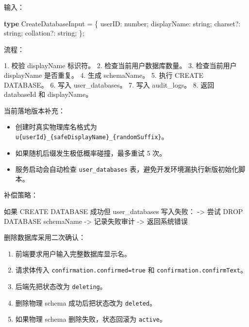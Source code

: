 \documentclass[
  a4paper,
  UTF8]{ctexart}
\newenvironment{Shaded}{}{}
\newcommand{\DataTypeTok}[1]{\textcolor[rgb]{0.56,0.13,0.00}{#1}}
\newcommand{\KeywordTok}[1]{\textcolor[rgb]{0.00,0.44,0.13}{\textbf{#1}}}
\newcommand{\NormalTok}[1]{#1}
\newcommand{\OperatorTok}[1]{\textcolor[rgb]{0.40,0.40,0.40}{#1}}
\providecommand{\tightlist}{%
  \setlength{\itemsep}{0pt}\setlength{\parskip}{0pt}}
\begin{document}
输入：

\begin{Shaded}
\begin{Highlighting}[]
\KeywordTok{type}\NormalTok{ CreateDatabaseInput }\OperatorTok{=}\NormalTok{ \{}
\NormalTok{  userID}\OperatorTok{:} \DataTypeTok{number}\OperatorTok{;}
\NormalTok{  displayName}\OperatorTok{:} \DataTypeTok{string}\OperatorTok{;}
\NormalTok{  charset}\OperatorTok{?:} \DataTypeTok{string}\OperatorTok{;}
\NormalTok{  collation}\OperatorTok{?:} \DataTypeTok{string}\OperatorTok{;}
\NormalTok{\}}\OperatorTok{;}
\end{Highlighting}
\end{Shaded}

流程：

\begin{Shaded}
\begin{Highlighting}[]
\NormalTok{1. 校验 displayName 标识符。}
\NormalTok{2. 检查当前用户数据库数量。}
\NormalTok{3. 检查当前用户 displayName 是否重复。}
\NormalTok{4. 生成 schemaName。}
\NormalTok{5. 执行 CREATE DATABASE。}
\NormalTok{6. 写入 user\_databases。}
\NormalTok{7. 写入 audit\_logs。}
\NormalTok{8. 返回 databaseId 和 displayName。}
\end{Highlighting}
\end{Shaded}

当前落地版本补充：

\begin{itemize}
\tightlist
\item
  创建时真实物理库名格式为
  \texttt{u\{userId\}\_\{safeDisplayName\}\_\{randomSuffix\}}。
\item
  如果随机后缀发生极低概率碰撞，最多重试 5 次。
\item
  服务启动会自动检查 \texttt{user\_databases}
  表，避免开发环境漏执行新版初始化脚本。
\end{itemize}

补偿策略：

\begin{Shaded}
\begin{Highlighting}[]
\NormalTok{如果 CREATE DATABASE 成功但 user\_databases 写入失败：}
\NormalTok{  {-}\textgreater{} 尝试 DROP DATABASE schemaName}
\NormalTok{  {-}\textgreater{} 记录失败审计}
\NormalTok{  {-}\textgreater{} 返回系统错误}
\end{Highlighting}
\end{Shaded}

删除数据库采用二次确认：

\begin{enumerate}
\def\labelenumi{\arabic{enumi}.}
\tightlist
\item
  前端要求用户输入完整数据库显示名。
\item
  请求体传入 \texttt{confirmation.confirmed=true} 和
  \texttt{confirmation.confirmText}。
\item
  后端先把状态改为 \texttt{deleting}。
\item
  删除物理 schema 成功后把状态改为 \texttt{deleted}。
\item
  如果物理 schema 删除失败，状态回滚为 \texttt{active}。
\end{enumerate}
\end{document}
